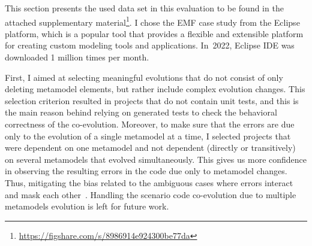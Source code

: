 This section presents the used data set in this evaluation to be found in the attached supplementary material\footnote{\url{https://figshare.com/s/8986914e924300be77da}}.
%
I chose the EMF case study from the Eclipse platform, which is a popular tool that provides a flexible and extensible platform for creating custom modeling tools and applications. In~2022, Eclipse IDE was downloaded 1 million times per month.

First, I aimed at selecting meaningful evolutions that do not consist of only deleting metamodel elements, but rather include complex evolution changes. 
\red{}This selection criterion resulted in projects that do not contain unit tests, and this is the main reason behind relying on generated tests to check the behavioral correctness of the co-evolution. %
Moreover, to make sure that the errors are due only to the evolution of a single metamodel at a time, I selected projects that were dependent on one metamodel and not dependent (directly or transitively) on several metamodels that evolved simultaneously. This gives us more confidence in observing the resulting errors in the code due only to metamodel changes. Thus, mitigating the bias related to the ambiguous cases where errors interact and mask each other~\cite{bohme2013regression}. Handling the scenario code co-evolution due to multiple metamodels evolution is left for future work. 

